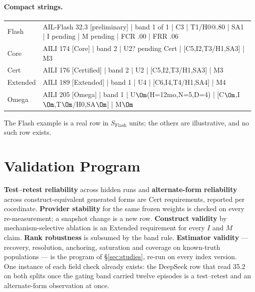 \paragraph{Compact strings.}
\begin{center}\footnotesize
\begin{tabularx}{\textwidth}{@{}l >{\raggedright\arraybackslash\ttfamily}X@{}}
Flash & AIL-Flash 32.3 [preliminary] | band 1 of 1 | C3 | T1/H0@.80 | SA1 | I pending | M pending | FCR .00 | FRR .06 \\
Core & AILI 174 [Core] | band 2 | U2? pending Cert | [C5,I2,T3/H1,SA3] | M3 \\
Cert & AILI 176 [Certified] | band 2 | U2 | [C5,I2,T3/H1,SA3] | M3 \\
Extended & AILI 189 [Extended] | band 1 | U4 | [C6,I4,T4/H1,SA4] | M4 \\
Omega & AILI 205 [Omega] | band 1 | U$\Om$(H=12mo,N=5,D=4) | [C$\Om$,I$\Om$,T$\Om$/H0,SA$\Om$] | M$\Om$ \\
\end{tabularx}
\end{center}
\noindent The Flash example is a real row in $S_{\mathrm{Flash}}$ units; the others are illustrative, and no such row exists.

\section{Validation Program}\label{sec:validation}

\textbf{Test--retest reliability} across hidden runs and \textbf{alternate-form reliability} across construct-equivalent generated forms are Cert requirements, reported per coordinate. \textbf{Provider stability} for the same frozen weights is checked on every re-measurement; a snapshot change is a new row. \textbf{Construct validity} by mechanism-selective ablation is an Extended requirement for every $I$ and $M$ claim. \textbf{Rank robustness} is subsumed by the band rule. \textbf{Estimator validity} --- recovery, resolution, anchoring, saturation and coverage on known-truth populations --- is the program of \S\ref{sec:studies}, re-run on every index version. One instance of each field check already exists: the DeepSeek row that read 35.2 on both splits once the gating band carried twelve episodes is a test--retest and an alternate-form observation at once.


